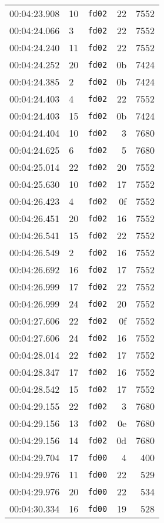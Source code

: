 \documentclass{article}
\begin{document}
\begin{longtable}{lllrr}
00:04:23.908 & 10 & \texttt{fd02} & 22 & 7552 \\
00:04:24.066 & 3 & \texttt{fd02} & 22 & 7552 \\
00:04:24.240 & 11 & \texttt{fd02} & 22 & 7552 \\
00:04:24.252 & 20 & \texttt{fd02} & 0b & 7424 \\
00:04:24.385 & 2 & \texttt{fd02} & 0b & 7424 \\
00:04:24.403 & 4 & \texttt{fd02} & 22 & 7552 \\
00:04:24.403 & 15 & \texttt{fd02} & 0b & 7424 \\
00:04:24.404 & 10 & \texttt{fd02} & 3 & 7680 \\
00:04:24.625 & 6 & \texttt{fd02} & 5 & 7680 \\
00:04:25.014 & 22 & \texttt{fd02} & 20 & 7552 \\
00:04:25.630 & 10 & \texttt{fd02} & 17 & 7552 \\
00:04:26.423 & 4 & \texttt{fd02} & 0f & 7552 \\
00:04:26.451 & 20 & \texttt{fd02} & 16 & 7552 \\
00:04:26.541 & 15 & \texttt{fd02} & 22 & 7552 \\
00:04:26.549 & 2 & \texttt{fd02} & 16 & 7552 \\
00:04:26.692 & 16 & \texttt{fd02} & 17 & 7552 \\
00:04:26.999 & 17 & \texttt{fd02} & 22 & 7552 \\
00:04:26.999 & 24 & \texttt{fd02} & 20 & 7552 \\
00:04:27.606 & 22 & \texttt{fd02} & 0f & 7552 \\
00:04:27.606 & 24 & \texttt{fd02} & 16 & 7552 \\
00:04:28.014 & 22 & \texttt{fd02} & 17 & 7552 \\
00:04:28.347 & 17 & \texttt{fd02} & 16 & 7552 \\
00:04:28.542 & 15 & \texttt{fd02} & 17 & 7552 \\
00:04:29.155 & 22 & \texttt{fd02} & 3 & 7680 \\
00:04:29.156 & 13 & \texttt{fd02} & 0e & 7680 \\
00:04:29.156 & 14 & \texttt{fd02} & 0d & 7680 \\
00:04:29.704 & 17 & \texttt{fd00} & 4 & 400 \\
00:04:29.976 & 11 & \texttt{fd00} & 22 & 529 \\
00:04:29.976 & 20 & \texttt{fd00} & 22 & 534 \\
00:04:30.334 & 16 & \texttt{fd00} & 19 & 528 \\

\end{longtable}
\end{document}
